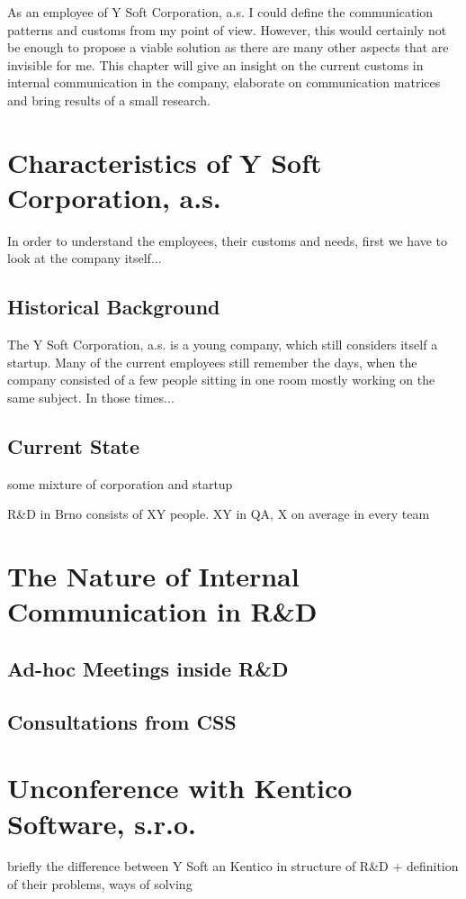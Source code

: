 \documentclass[11pt,singleside]{myfithesis2}
\begin{document}
As an employee of Y Soft Corporation, a.s. I could define the communication patterns and customs from my point of view. However, this would certainly not be enough to propose a viable solution as there are many other aspects that are invisible for me. This chapter will give an insight on the current customs in internal communication in the company, elaborate on communication matrices and bring results of a small research.

	\section{Characteristics of Y Soft Corporation, a.s.}
In order to understand the employees, their customs and needs, first we have to look at the company itself...

		\subsection{Historical Background}
The Y Soft Corporation, a.s. is a young company, which still considers itself a startup. Many of the current employees still remember the days, when the company consisted of a few people sitting in one room mostly working on the same subject. In those times...

		\subsection{Current State}
some mixture of corporation and startup

R\&D in Brno consists of XY people. XY in QA, X on average in every team

	\section{The Nature of Internal Communication in R\&D}

		\subsection{Ad-hoc Meetings inside R\&D}
		
		\subsection{Consultations from CSS}

	\section{Unconference with Kentico Software, s.r.o.}
briefly the difference between Y Soft an Kentico in structure of R\&D + definition of their problems, ways of solving
\end{document}
